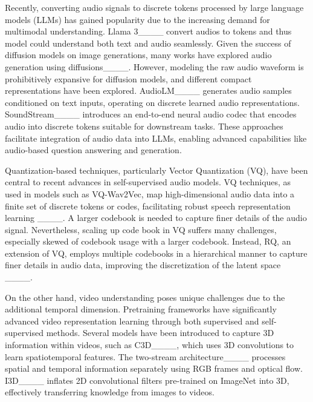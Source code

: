 Recently, converting audio signals to discrete tokens processed by large language models (LLMs) has gained popularity due to the increasing demand for multimodal understanding. Llama 3____ convert audios to tokens and thus model could understand both text and audio seamlessly. Given the success of diffusion models on image generations, many works have explored audio generation using diffusions____. However, modeling the raw audio waveform is prohibitively expansive for diffusion models, and different compact representations have been explored. AudioLM____ generates audio samples conditioned on text inputs, operating on discrete learned audio representations. SoundStream____ introduces an end-to-end neural audio codec that encodes audio into discrete tokens suitable for downstream tasks. These approaches facilitate integration of audio data into LLMs, enabling advanced capabilities like audio-based question answering and generation.

Quantization-based techniques, particularly Vector Quantization (VQ), have been central to recent advances in self-supervised audio models. VQ techniques, as used in models such as VQ-Wav2Vec, map high-dimensional audio data into a finite set of discrete tokens or codes, facilitating robust speech representation learning ____. A larger codebook is needed to capture finer details of the audio signal. Nevertheless, scaling up code book in VQ suffers many challenges, especially skewed of codebook usage with a larger codebook. Instead, RQ, an extension of VQ, employs multiple codebooks in a hierarchical manner to capture finer details in audio data, improving the discretization of the latent space ____.

On the other hand, video understanding poses unique challenges due to the additional temporal dimension. Pretraining frameworks have significantly advanced video representation learning through both supervised and self-supervised methods.
Several models have been introduced to capture 3D information within videos, such as C3D____, which uses 3D convolutions to learn spatiotemporal features. The two-stream architecture____ processes spatial and temporal information separately using RGB frames and optical flow. I3D____ inflates 2D convolutional filters pre-trained on ImageNet into 3D, effectively transferring knowledge from images to videos.

